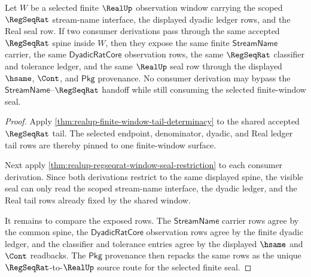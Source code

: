 \begin{theorem}
\label{thm:regseqrat-window-source-route-uniqueness}
Let $W$ be a selected finite $\RealUp$ observation window carrying the scoped
$\RegSeqRat$ stream-name interface, the displayed dyadic ledger rows, and the
Real seal row. If two consumer derivations pass through the same accepted
$\RegSeqRat$ spine inside $W$, then they expose the same finite
$\mathsf{StreamName}$ carrier, the same $\mathsf{DyadicRatCore}$ observation
rows, the same $\RegSeqRat$ classifier and tolerance ledger, and the same
$\RealUp$ seal row through the displayed $\hsame$, $\Cont$, and $\mathsf{Pkg}$
provenance. No consumer derivation may bypass the
$\mathsf{StreamName}$--$\RegSeqRat$ handoff while still consuming the selected
finite-window seal.
\end{theorem}
\begin{proof}
Apply \autoref{thm:realup-finite-window-tail-determinacy} to the shared
accepted $\RegSeqRat$ tail. The selected endpoint, denominator, dyadic, and
Real ledger tail rows are thereby pinned to one finite-window surface.

Next apply \autoref{thm:realup-regseqrat-window-seal-restriction} to each
consumer derivation. Since both derivations restrict to the same displayed
spine, the visible seal can only read the scoped stream-name interface, the
dyadic ledger, and the Real tail rows already fixed by the shared window.

It remains to compare the exposed rows. The $\mathsf{StreamName}$ carrier rows
agree by the common spine, the $\mathsf{DyadicRatCore}$ observation rows agree
by the finite dyadic ledger, and the classifier and tolerance entries agree by
the displayed $\hsame$ and $\Cont$ readbacks. The $\mathsf{Pkg}$ provenance
then repacks the same rows as the unique $\RegSeqRat$-to-$\RealUp$ source route
for the selected finite seal.
\end{proof}
